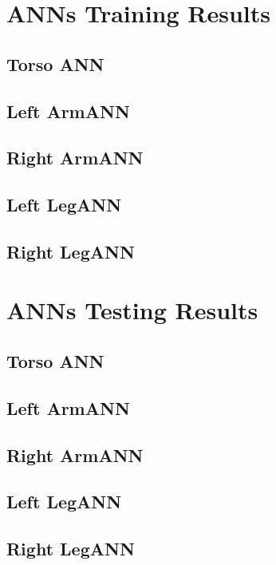 \documentclass[titlepage,12pt,a4paper,times]{book}
\begin{document}
\section{\acsp{ANN} Training Results}
\label{chap4:sec:anntr}
\subsection{Torso \acs{ANN}}
\label{chap4:anntr:tann}
\subsection{Left Arm\acs{ANN}}
\label{chap4:anntr:laann}
\subsection{Right Arm\acs{ANN}}
\label{chap4:anntr:raann}
\subsection{Left Leg\acs{ANN}}
\label{chap4:anntr:llann}
\subsection{Right Leg\acs{ANN}}
\label{chap4:anntr:rlann}

\section{\acsp{ANN} Testing Results}
\label{chap4:sec:anntst}
\subsection{Torso \acs{ANN}}
\label{chap4:anntst:tann}
\subsection{Left Arm\acs{ANN}}
\label{chap4:anntst:laann}
\subsection{Right Arm\acs{ANN}}
\label{chap4:anntst:raann}
\subsection{Left Leg\acs{ANN}}
\label{chap4:anntst:llann}
\subsection{Right Leg\acs{ANN}}
\label{chap4:anntst:rlann}
\end{document}
